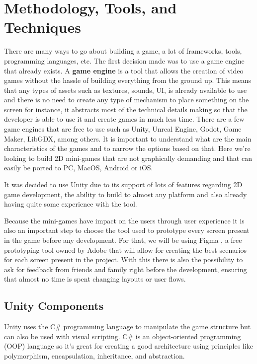 

\newpage
\section{Methodology, Tools, and Techniques}
There are many ways to go about building a game, a lot of frameworks, tools, programming languages, etc. The first decision made was to use a game engine that already exists. A \textbf{game engine} is a tool that allows the creation of video games without the hassle of building everything from the ground up. This means that any types of assets such as textures, sounds, UI, is already available to use and there is no need to create any type of mechanism to place something on the screen for instance, it abstracts most of the technical details making so that the developer is able to use it and create games in much less time. There are a few game engines that are free to use such as Unity, Unreal Engine, Godot, Game Maker, LibGDX, among others.
It is important to understand what are the main characteristics of the games and to narrow the options based on that.
Here we're looking to build 2D mini-games that are not graphically demanding and that can easily be ported to PC, MacOS, Android or iOS.

It was decided to use Unity due to its support of lots of features regarding 2D game development, the ability to build to almost any platform and also already having quite some experience with the tool.

Because the mini-games have impact on the users through user experience it is also an important step to choose the tool used to prototype every screen present in the game before any development. For that, we will be using Figma \cite{figma}, a free prototyping tool owned by Adobe that will allow for creating the best scenarios for each screen present in the project. With this there is also the possibility to ask for feedback from friends and family right before the development, ensuring that almost no time is spent changing layouts or user flows.

\newpage
\subsection{Unity Components}
Unity uses the C\# programming language to manipulate the game structure but can also be used with visual scripting. C\# is an object-oriented programming (OOP) language so it's great for creating a good architecture using principles like polymorphism, encapsulation, inheritance, and abstraction.

